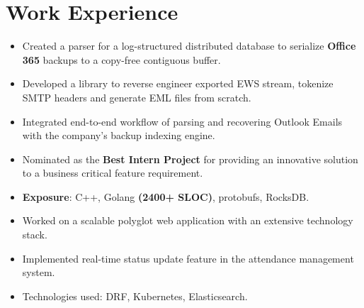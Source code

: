 \documentclass[10pt, margin=0.5in]{deedy-resume-openfont}
\begin{document}
\hfill
\begin{minipage}[t]{0.48\textwidth}

\vspace{-8pt}
\section{Work Experience}

\begin{itemize}[leftmargin=*, noitemsep]
  \item Created a parser for a log-structured distributed database to serialize
  \textbf{Office 365} backups to a copy-free contiguous buffer.
  \item Developed a library to reverse engineer exported EWS stream, tokenize SMTP
	headers and generate EML files from scratch.
  \item Integrated end-to-end workflow of parsing and recovering Outlook Emails
	with the company's backup indexing engine.
  \item Nominated as the \textbf{Best Intern Project} for providing an innovative
	solution to a business critical feature requirement.
  \item \textbf{Exposure}: C++, Golang \textbf{(2400+ SLOC)}, protobufs, RocksDB.

\end{itemize}

\vspace{5pt}
\begin{itemize}[leftmargin=*, noitemsep]
  \item Worked on a scalable polyglot web application with an extensive technology stack.
  \item Implemented real-time status update feature in the attendance management system.
  \item Technologies used: DRF, Kubernetes, Elasticsearch.
\end{itemize}


\end{minipage}
\end{document}
